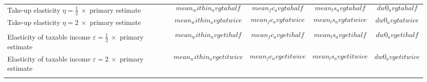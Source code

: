 \begin{tabular*}{1.38\textwidth}{@{\extracolsep{\fill}}lcccc}
\\ 
Take-up elasticity $\eta = \frac{1}{2} \ \times$ primary estimate  & $$mean_within_avgtahalf$$
& $$mean_fc_avgtahalf$$ & $$mean_ls_avgtahalf$$ 
& $$dw0_avgtahalf$$  \\
Take-up elasticity $\eta = 2 \ \times$ primary estimate  & $$mean_within_avgtatwice$$
& $$mean_fc_avgtatwice$$ & $$mean_ls_avgtatwice$$ & 
$$dw0_avgtatwice$$  \\ 
\\
Elasticity of taxable income $\varepsilon = \frac{1}{2} \ \times$ primary estimate  & $$mean_within_avgetihalf$$
& $$mean_fc_avgetihalf$$ & $$mean_ls_avgetihalf$$ 
& $$dw0_avgetihalf$$  \\
Elasticity of taxable income $\varepsilon = 2 \ \times$ primary estimate  & $$mean_within_avgetitwice$$
& $$mean_fc_avgetitwice$$ & $$mean_ls_avgetitwice$$ & 
$$dw0_avgetitwice$$  \\ \addlinespace
\bottomrule
\end{tabular*}

